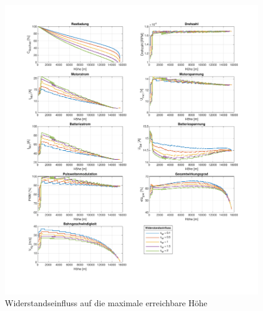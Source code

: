 \begin{figure}[H]
\centering
	\includegraphics[scale=0.7]{Diagramme/C_W_Untersuchung.pdf}
	\caption{Widerstandseinfluss auf die maximale erreichbare Höhe}
	\label{abb:c_W_einfluss}
\end{figure}



